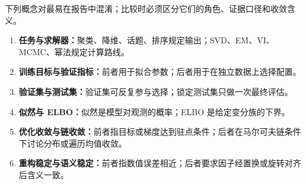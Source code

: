 \label{struct:V5-C08-CH31}
\begin{comparisonbox}
\small
{}
下列概念对最易在报告中混淆；比较时必须区分它们的角色、证据口径和收敛含义。
\begin{enumerate}[leftmargin=0pt,label={},topsep=0pt,itemsep=1pt,parsep=0pt,partopsep=0pt]
  \item \textbf{任务与求解器：}聚类、降维、话题、排序规定输出；SVD、EM、VI、MCMC、幂法规定计算路线。
  \item \textbf{训练目标与验证指标：}前者用于拟合参数；后者用于在独立数据上选择配置。
  \item \textbf{验证集与测试集：}验证集可反复参与选择；锁定测试集只做一次最终评估。
  \item \textbf{似然与 ELBO：}似然是模型对观测的概率；ELBO 是给定变分族的下界。
  \item \textbf{优化收敛与链收敛：}前者指目标或梯度达到驻点条件；后者在马尔可夫链条件下讨论分布或遍历均值收敛。
  \item \textbf{重构稳定与语义稳定：}前者指数值误差相近；后者要求因子经置换或旋转对齐后含义一致。
\end{enumerate}
\end{comparisonbox}



